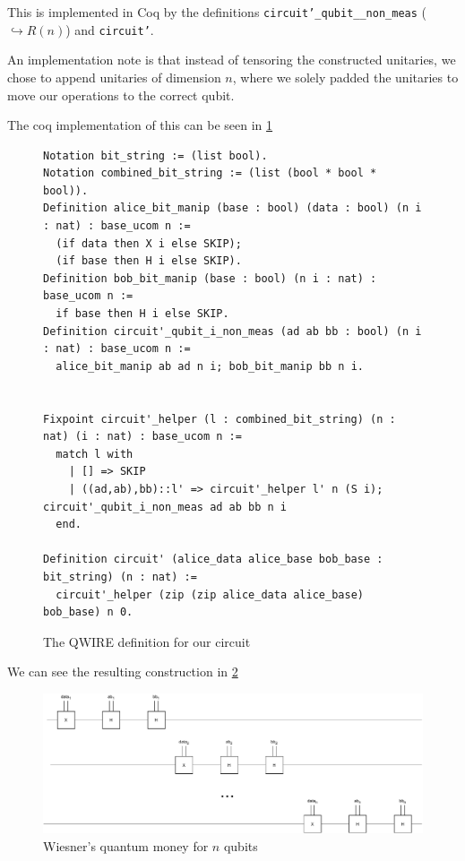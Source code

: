 \documentclass{article}
\begin{document}
This is implemented in Coq by the definitions \texttt{circuit'\_qubit\_\_non\_meas} ($\hookrightarrow R(n)$) and \texttt{circuit'}.

An implementation note is that instead of tensoring the constructed unitaries, we chose to append unitaries of dimension $n$, where we solely padded the unitaries to move our operations to the correct qubit.

The coq implementation of this can be seen in \cref{fig:coq-circuit}
\begin{figure}[h]
    \centering
    \begin{verbatim}
Notation bit_string := (list bool).
Notation combined_bit_string := (list (bool * bool * bool)).    
Definition alice_bit_manip (base : bool) (data : bool) (n i : nat) : base_ucom n :=
  (if data then X i else SKIP);
  (if base then H i else SKIP).
Definition bob_bit_manip (base : bool) (n i : nat) : base_ucom n :=
  if base then H i else SKIP.
Definition circuit'_qubit_i_non_meas (ad ab bb : bool) (n i : nat) : base_ucom n := 
  alice_bit_manip ab ad n i; bob_bit_manip bb n i.

 
Fixpoint circuit'_helper (l : combined_bit_string) (n : nat) (i : nat) : base_ucom n :=
  match l with
    | [] => SKIP
    | ((ad,ab),bb)::l' => circuit'_helper l' n (S i); circuit'_qubit_i_non_meas ad ab bb n i
  end.
    
Definition circuit' (alice_data alice_base bob_base : bit_string) (n : nat) :=
  circuit'_helper (zip (zip alice_data alice_base) bob_base) n 0.
    \end{verbatim}
    \caption{The QWIRE definition for our circuit}
    \label{fig:coq-circuit}
\end{figure}

We can see the resulting construction in \cref{fig:circuit}

\begin{figure}[h]
    \centering
    \includegraphics[width=\textwidth]{res/Wiesner.pdf}
    \caption{Wiesner's quantum money for $n$ qubits}
    \label{fig:circuit}
\end{figure}
\end{document}
